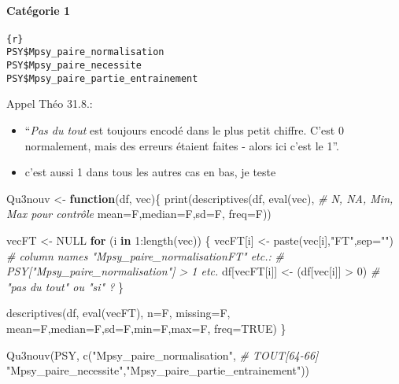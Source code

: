 \documentclass[
]{article}
\newenvironment{Shaded}{\begin{snugshade}}{\end{snugshade}}
\newcommand{\AttributeTok}[1]{\textcolor[rgb]{0.77,0.63,0.00}{#1}}
\newcommand{\CommentTok}[1]{\textcolor[rgb]{0.56,0.35,0.01}{\textit{#1}}}
\newcommand{\ConstantTok}[1]{\textcolor[rgb]{0.00,0.00,0.00}{#1}}
\newcommand{\ControlFlowTok}[1]{\textcolor[rgb]{0.13,0.29,0.53}{\textbf{#1}}}
\newcommand{\DecValTok}[1]{\textcolor[rgb]{0.00,0.00,0.81}{#1}}
\newcommand{\FunctionTok}[1]{\textcolor[rgb]{0.00,0.00,0.00}{#1}}
\newcommand{\NormalTok}[1]{#1}
\newcommand{\OtherTok}[1]{\textcolor[rgb]{0.56,0.35,0.01}{#1}}
\newcommand{\SpecialCharTok}[1]{\textcolor[rgb]{0.00,0.00,0.00}{#1}}
\newcommand{\StringTok}[1]{\textcolor[rgb]{0.31,0.60,0.02}{#1}}
\providecommand{\tightlist}{%
  \setlength{\itemsep}{0pt}\setlength{\parskip}{0pt}}
\begin{document}
\hypertarget{catuxe9gorie-1}{%
\paragraph{Catégorie 1}\label{catuxe9gorie-1}}

\begin{verbatim}
{r}
PSY$Mpsy_paire_normalisation
PSY$Mpsy_paire_necessite
PSY$Mpsy_paire_partie_entrainement
\end{verbatim}

Appel Théo 31.8.:

\begin{itemize}
\tightlist
\item
  ``\emph{Pas du tout} est toujours encodé dans le plus petit chiffre.
  C'est 0 normalement, mais des erreurs étaient faites - alors ici c'est
  le 1''.
\item
  c'est aussi 1 dans tous les autres cas en bas, je teste
\end{itemize}

\begin{Shaded}
\begin{Highlighting}[]
\NormalTok{Qu3nouv }\OtherTok{\textless{}{-}} \ControlFlowTok{function}\NormalTok{(df, vec)\{}
  \FunctionTok{print}\NormalTok{(}\FunctionTok{descriptives}\NormalTok{(df, }\FunctionTok{eval}\NormalTok{(vec),            }\CommentTok{\# N, NA, Min, Max pour contrôle}
               \AttributeTok{mean=}\NormalTok{F,}\AttributeTok{median=}\NormalTok{F,}\AttributeTok{sd=}\NormalTok{F,}
               \AttributeTok{freq=}\NormalTok{F))}

\NormalTok{    vecFT }\OtherTok{\textless{}{-}} \ConstantTok{NULL}
  \ControlFlowTok{for}\NormalTok{ (i }\ControlFlowTok{in} \DecValTok{1}\SpecialCharTok{:}\FunctionTok{length}\NormalTok{(vec)) \{}
\NormalTok{    vecFT[i] }\OtherTok{\textless{}{-}} \FunctionTok{paste}\NormalTok{(vec[i],}\StringTok{"FT"}\NormalTok{,}\AttributeTok{sep=}\StringTok{""}\NormalTok{)  }\CommentTok{\# column names "Mpsy\_paire\_normalisationFT" etc.:}
                                           \CommentTok{\# PSY["Mpsy\_paire\_normalisation"]       \textgreater{} 1 etc.}
\NormalTok{    df[vecFT[i]] }\OtherTok{\textless{}{-}}\NormalTok{ (df[vec[i]] }\SpecialCharTok{\textgreater{}} \DecValTok{0}\NormalTok{)       }\CommentTok{\# "pas du tout" ou "si" ?}
\NormalTok{  \}}

  \FunctionTok{descriptives}\NormalTok{(df, }\FunctionTok{eval}\NormalTok{(vecFT),}
               \AttributeTok{n=}\NormalTok{F, }\AttributeTok{missing=}\NormalTok{F,}
               \AttributeTok{mean=}\NormalTok{F,}\AttributeTok{median=}\NormalTok{F,}\AttributeTok{sd=}\NormalTok{F,}\AttributeTok{min=}\NormalTok{F,}\AttributeTok{max=}\NormalTok{F,}
               \AttributeTok{freq=}\ConstantTok{TRUE}\NormalTok{)}
\NormalTok{\}}

\FunctionTok{Qu3nouv}\NormalTok{(PSY, }\FunctionTok{c}\NormalTok{(}\StringTok{"Mpsy\_paire\_normalisation"}\NormalTok{,  }\CommentTok{\# TOUT[64{-}66]}
               \StringTok{"Mpsy\_paire\_necessite"}\NormalTok{,}\StringTok{"Mpsy\_paire\_partie\_entrainement"}\NormalTok{))}
\end{Highlighting}
\end{Shaded}
\end{document}
